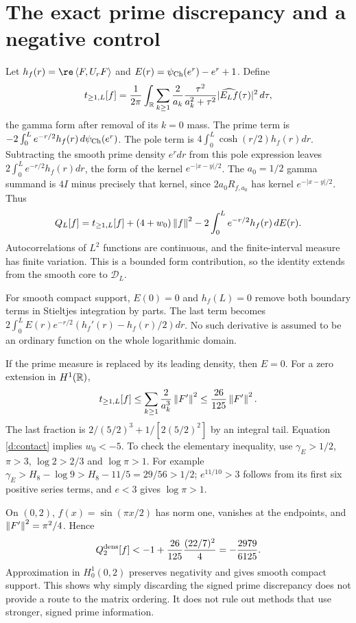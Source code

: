 \section{The exact prime discrepancy and a negative control}
Let $h_f(r)=\re\ip F{U_rF}$ and
$E(r)=\psi_{\rm Ch}(e^r)-e^r+1$. Define
\[
t_{\ge1,L}[f]=\frac1{2\pi}\int_\mathbb R
\sum_{k\ge1}\frac2{a_k}\frac{\tau^2}{a_k^2+\tau^2}
|\widehat{E_Lf}(\tau)|^2\,d\tau,
\]
the gamma form after removal of its $k=0$ mass. The prime term is
$-2\int_0^L e^{-r/2}h_f(r)\,d\psi_{\rm Ch}(e^r)$.
The pole term is $4\int_0^L\cosh(r/2)h_f(r)dr$.
Subtracting the smooth prime density $e^rdr$ from this pole expression
leaves $2\int_0^Le^{-r/2}h_f(r)dr$, the form of the kernel
$e^{-|x-y|/2}$. The $a_0=1/2$ gamma summand is $4I$ minus precisely
that kernel, since $2a_0R_{f,a_0}$ has kernel $e^{-|x-y|/2}$.
Thus
\begin{equation}\label{d:discrepancy}
Q_L[f]=t_{\ge1,L}[f]+(4+w_0)\left\lVert f\right\rVert^2
-2\int_0^Le^{-r/2}h_f(r)\,dE(r).
\end{equation}
Autocorrelations of $L^2$ functions are continuous, and the finite-interval
measure has finite variation. This is a bounded form contribution, so
the identity extends from the smooth core to $\mathcal D_L$.

For smooth compact support, $E(0)=0$ and $h_f(L)=0$ remove both boundary
terms in Stieltjes integration by parts. The last term becomes
$2\int_0^L E(r)e^{-r/2}(h_f'(r)-h_f(r)/2)dr$. No such derivative is
assumed to be an ordinary function on the whole logarithmic domain.

If the prime measure is replaced by its leading density, then $E=0$.
For a zero extension in $H^1(\mathbb R)$,
\[
t_{\ge1,L}[f]\le\sum_{k\ge1}\frac2{a_k^3}\left\lVert F'\right\rVert^2
\le\frac{26}{125}\left\lVert F'\right\rVert^2.
\]
The last fraction is $2/(5/2)^3+1/[2(5/2)^2]$ by an integral tail.
Equation \eqref{d:contact} implies $w_0<-5$. To check the elementary
inequality, use $\gamma_E>1/2$, $\pi>3$, $\log2>2/3$ and $\log\pi>1$.
For example
$\gamma_E>H_8-\log9>H_8-11/5=29/56>1/2$;
$e^{11/10}>3$ follows from its first six positive series terms,
and $e<3$ gives $\log\pi>1$.

On $(0,2)$, $f(x)=\sin(\pi x/2)$ has norm one, vanishes at the endpoints,
and $\left\lVert F'\right\rVert^2=\pi^2/4$. Hence
\[
Q_2^{\rm dens}[f]<-1+\frac{26}{125}\frac{(22/7)^2}{4}
=-\frac{2979}{6125}.
\]
Approximation in $H_0^1(0,2)$ preserves negativity and gives smooth compact
support. This shows why simply discarding the signed prime discrepancy
does not provide a route to the matrix ordering. It does not rule out
methods that use stronger, signed prime information.

